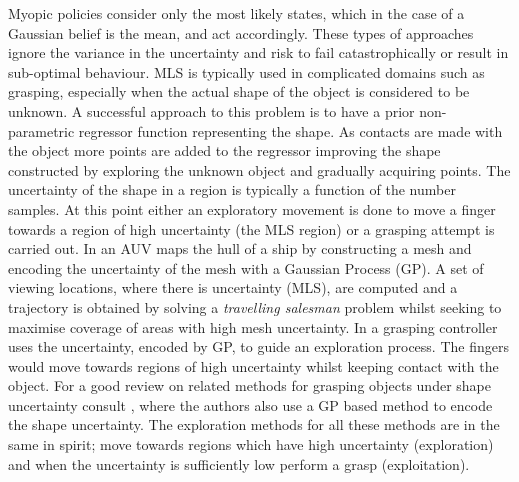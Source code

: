 Myopic policies consider only the most likely states, which in the case of a Gaussian belief is the mean, and act accordingly. These types of approaches 
ignore the variance in the uncertainty and risk to fail catastrophically or result in sub-optimal behaviour. MLS is typically used in complicated domains such as grasping, especially when the actual 
shape of the object is considered to be unknown. A successful approach to this problem is to have a prior non-parametric regressor function representing the shape. 
As contacts are made with the object more points are added to the regressor improving the shape constructed by exploring the unknown object 
and gradually acquiring points. The uncertainty of the shape in a region is typically a function of the number samples. At this point either
an exploratory movement is done to move a finger towards a region of high uncertainty (the MLS region) or a grasping attempt is carried out. 
In \cite{un_water_inspection_icra_2012} an AUV maps the hull of a ship by constructing a mesh and encoding the uncertainty of the mesh with a Gaussian Process (GP). 
A set of viewing locations, where there is uncertainty (MLS), are computed and a trajectory is obtained by solving a \textit{travelling salesman} problem 
whilst seeking to maximise coverage of areas with high mesh uncertainty. In \cite{u_aware_grasp_ICRA_2015} a grasping controller uses the uncertainty, encoded by GP, to guide an exploration process. The fingers would move towards regions of high uncertainty whilst keeping contact with the object. For a good review on related methods for grasping objects under shape uncertainty consult \cite{Li_2015}, where the authors also use a GP based method to encode the shape uncertainty. 
The exploration methods for all these methods are in the same in spirit; move towards 
regions which have high uncertainty (exploration) and when the uncertainty is sufficiently low perform a grasp (exploitation).



